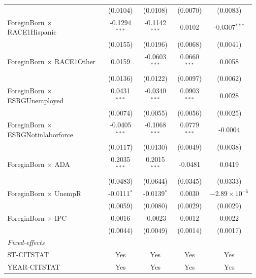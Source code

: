 \begin{tabular}{lcccc}
                                             & (0.0104)        & (0.0108)        & (0.0070)        & (0.0083)\\   
   ForeginBorn $\times$ RACE1Hispanic        & -0.1294$^{***}$ & -0.1142$^{***}$ & 0.0102          & -0.0307$^{***}$\\   
                                             & (0.0155)        & (0.0196)        & (0.0068)        & (0.0041)\\   
   ForeginBorn $\times$ RACE1Other           & 0.0159          & -0.0603$^{***}$ & 0.0660$^{***}$  & 0.0058\\   
                                             & (0.0136)        & (0.0122)        & (0.0097)        & (0.0062)\\   
   ForeginBorn $\times$ ESRGUnemployed       & 0.0431$^{***}$  & -0.0340$^{***}$ & 0.0903$^{***}$  & 0.0028\\   
                                             & (0.0074)        & (0.0055)        & (0.0056)        & (0.0025)\\   
   ForeginBorn $\times$ ESRGNotinlaborforce  & -0.0405$^{***}$ & -0.1068$^{***}$ & 0.0779$^{***}$  & -0.0004\\   
                                             & (0.0117)        & (0.0130)        & (0.0049)        & (0.0038)\\   
   ForeginBorn $\times$ ADA                  & 0.2035$^{***}$  & 0.2015$^{***}$  & -0.0481         & 0.0419\\   
                                             & (0.0483)        & (0.0644)        & (0.0345)        & (0.0333)\\   
   ForeginBorn $\times$ UnempR               & -0.0111$^{*}$   & -0.0139$^{*}$   & 0.0030          & $-2.89\times 10^{-5}$\\    
                                             & (0.0059)        & (0.0080)        & (0.0029)        & (0.0029)\\   
   ForeginBorn $\times$ IPC                  & 0.0016          & -0.0023         & 0.0012          & 0.0022\\   
                                             & (0.0044)        & (0.0049)        & (0.0014)        & (0.0017)\\   
   \midrule
   \emph{Fixed-effects}\\
   ST-CITSTAT                                & Yes             & Yes             & Yes             & Yes\\  
   YEAR-CITSTAT                              & Yes             & Yes             & Yes             & Yes\\  

\end{tabular}
